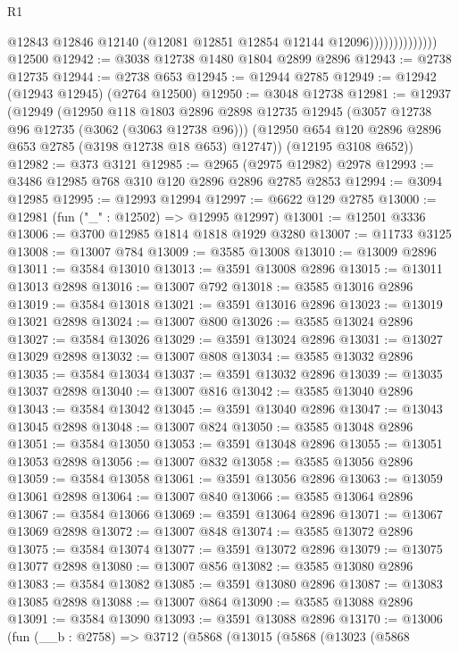 \begin{lexlean}{R1}
\begin{coremodule}
                              @12843
                              @12846
                              @12140
                              (@12081 @12851 @12854 @12144 @12096))))))))))))))
    @12500
@12942 := @3038 @12738 @1480 @1804 @2899 @2896
@12943 := @2738 @12735
@12944 := @2738 @653
@12945 := @12944 @2785
@12949 := @12942 (@12943 @12945) (@2764 @12500)
@12950 := @3048 @12738
@12981 := @12937
    (@12949
      (@12950
        @118
        @1803
        @2896
        @2898
        @12735
        @12945
        (@3057 @12738 @96 @12735 (@3062 (@3063 @12738 @96)))
        (@12950 @654 @120 @2896 @2896 @653 @2785 (@3198 @12738 @18 @653) @12747))
      (@12195 @3108 @652))
@12982 := @373 @3121
@12985 := @2965 (@2975 @12982) @2978
@12993 := @3486 @12985 @768 @310 @120 @2896 @2896 @2785 @2853
@12994 := @3094 @12985
@12995 := @12993 @12994
@12997 := @6622 @129 @2785
@13000 := @12981 (fun ("_" : @12502) => @12995 @12997)
@13001 := @12501 @3336
@13006 := @3700 @12985 @1814 @1818 @1929 @3280
@13007 := @11733 @3125
@13008 := @13007 @784
@13009 := @3585 @13008
@13010 := @13009 @2896
@13011 := @3584 @13010
@13013 := @3591 @13008 @2896
@13015 := @13011 @13013 @2898
@13016 := @13007 @792
@13018 := @3585 @13016 @2896
@13019 := @3584 @13018
@13021 := @3591 @13016 @2896
@13023 := @13019 @13021 @2898
@13024 := @13007 @800
@13026 := @3585 @13024 @2896
@13027 := @3584 @13026
@13029 := @3591 @13024 @2896
@13031 := @13027 @13029 @2898
@13032 := @13007 @808
@13034 := @3585 @13032 @2896
@13035 := @3584 @13034
@13037 := @3591 @13032 @2896
@13039 := @13035 @13037 @2898
@13040 := @13007 @816
@13042 := @3585 @13040 @2896
@13043 := @3584 @13042
@13045 := @3591 @13040 @2896
@13047 := @13043 @13045 @2898
@13048 := @13007 @824
@13050 := @3585 @13048 @2896
@13051 := @3584 @13050
@13053 := @3591 @13048 @2896
@13055 := @13051 @13053 @2898
@13056 := @13007 @832
@13058 := @3585 @13056 @2896
@13059 := @3584 @13058
@13061 := @3591 @13056 @2896
@13063 := @13059 @13061 @2898
@13064 := @13007 @840
@13066 := @3585 @13064 @2896
@13067 := @3584 @13066
@13069 := @3591 @13064 @2896
@13071 := @13067 @13069 @2898
@13072 := @13007 @848
@13074 := @3585 @13072 @2896
@13075 := @3584 @13074
@13077 := @3591 @13072 @2896
@13079 := @13075 @13077 @2898
@13080 := @13007 @856
@13082 := @3585 @13080 @2896
@13083 := @3584 @13082
@13085 := @3591 @13080 @2896
@13087 := @13083 @13085 @2898
@13088 := @13007 @864
@13090 := @3585 @13088 @2896
@13091 := @3584 @13090
@13093 := @3591 @13088 @2896
@13170 := @13006
    (fun (__b : @2758) =>
    @3712
      (@5868
        (@13015
          (@5868
            (@13023
              (@5868

\end{coremodule}
\end{lexlean}
